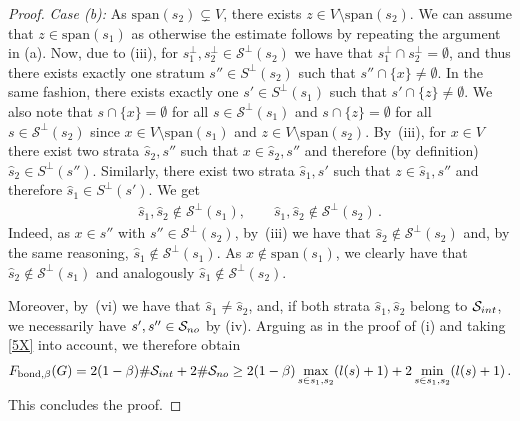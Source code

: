 \documentclass[10pt,a4paper]{amsart}
\begin{document}
\begin{proof}
\noindent \emph{Case {\rm (b)}:}  As $\mathrm{span}(s_2) \subsetneq V$, there exists $z \in V\setminus \mathrm{span}(s_2)$. We can assume that $z \in \mathrm{span}(s_1)$  as otherwise the estimate follows by repeating the argument in (a).  Now, due to (iii), for $s_1^\perp,s_2^\perp\in \mathcal{S}^\perp(s_2)$ we have that $s_1^\perp \cap s_2^\perp=\emptyset$,  and thus   there exists  exactly  one stratum $s''\in S^\perp(s_2)$ such that $s''\cap \{x\} \neq \emptyset$. In the same fashion, there exists exactly one  $s' \in S^\perp(s_1)$  such that $s'\cap \{z\} \neq \emptyset$.  We also note that $s\cap \{x\} = \emptyset$ for all $s\in \mathcal{S}^\perp(s_1)$ and $s\cap \{z\} = \emptyset$ for all $s\in \mathcal{S}^\perp(s_2)$ since $x \in V \setminus \mathrm{span}(s_1)$ and $z \in V\setminus \mathrm{span}(s_2)$. By~(iii),  for  $x\in V$ there exist two strata $\hat{s}_2, s''$ such that $x\in \hat{s}_2, s''$ and therefore (by definition) $\hat{s}_2 \in  S^\perp(s'')  $. Similarly, there exist two strata $\hat{s}_1, s'$ such that $ z \in \hat{s}_1, s''$ and therefore $\hat{s}_1 \in S^\perp(s')$.  We get 
\begin{align}\label{5X}
\hat{s}_1, \hat{s}_2 \notin \mathcal{S}^\perp(s_1), \quad \quad  \hat{s}_1, \hat{s}_2 \notin \mathcal{S}^\perp(s_2)\,.
\end{align}
Indeed,  as $x \in s''$ with $s'' \in \mathcal{S}^\perp(s_2)$, by~(iii) we have that  $\hat{s}_2 \notin \mathcal{S}^\perp(s_2)$ and, by the same reasoning, $\hat{s}_1 \notin \mathcal{S}^\perp(s_1)$. As $x \notin \mathrm{span}(s_1)$, we clearly have that $\hat{s}_2 \notin \mathcal{S}^\perp(s_1)$ and analogously $\hat{s}_1 \notin \mathcal{S}^\perp(s_2)$. 

Moreover,  by~(vi) we have that $\hat{s}_1 \neq \hat{s}_2$, and, if both strata $\hat{s}_1, \hat{s}_2$ belong to $\mathcal{S}_{\rm int}$,  we necessarily have    $s', s''\in \mathcal{S}_{\rm no}$ by (iv).  Arguing as in the proof of (i) and taking \eqref{5X} into account, we  therefore obtain 
\begin{align*}
 F_{\mathrm{bond},\beta} (G)  =  2(1-\beta) \#\mathcal{S}_{\rm int} + 2\#\mathcal{S}_{\rm no} \geq 2(1-\beta)\max_{s \in s_1,s_2} (l(s)+1) + 2\min_{s \in s_1,s_2} (l(s)+1) \,.
\end{align*}
This concludes the proof. 
\end{proof}
\end{document}
